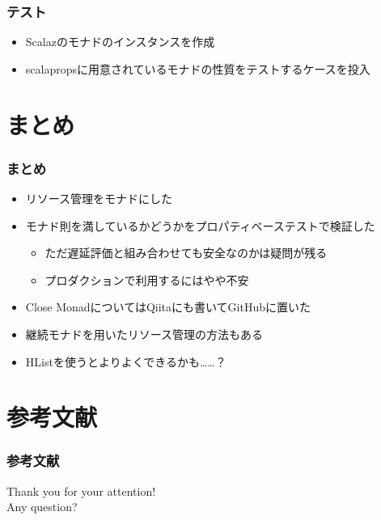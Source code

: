\begin{frame}
  \frametitle{テスト}

  

  \begin{itemize}
    \item<2-> Scalazのモナドのインスタンスを作成
    \item<3-> scalapropsに用意されているモナドの性質をテストするケースを投入
  \end{itemize}
\end{frame}

\section{まとめ}

\begin{frame}
  \frametitle{まとめ}

  \begin{itemize}
    \item<2-> リソース管理をモナドにした
    \item<3-> モナド則を満しているかどうかをプロパティベーステストで検証した
    \begin{itemize}
      \item<4-> ただ遅延評価と組み合わせても安全なのかは疑問が残る
      \item<5-> プロダクションで利用するにはやや不安
    \end{itemize}
    \item<6-> Close MonadについてはQiitaにも書いてGitHubに置いた\cite{closemonad,closemonadgithub}
    \item<7-> 継続モナドを用いたリソース管理の方法もある\cite{tanakh2015}
    \item<8-> HList\cite{Kiselyov2004,hlist}を使うとよりよくできるかも……？
  \end{itemize}
\end{frame}

\section*{参考文献}
\begin{frame}[allowframebreaks]
  \frametitle{参考文献}

  
  \nocite{*}

  
\end{frame}

\begin{frame}
  \centering
  {\Huge Thank you for your attention!\\
    \vspace{1em}
    Any question?
  }
\end{frame}


